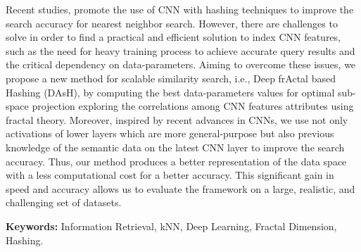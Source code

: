 Recent studies, promote the use of  \ac{CNN} with hashing techniques to improve the search accuracy for nearest neighbor search. However, there are challenges to solve in order to find a practical and efficient solution to index CNN features, such as the need for heavy training process to achieve accurate query results and the critical dependency on data-parameters.   Aiming to overcome these issues, we propose a new method for scalable similarity search, i.e., Deep frActal based  Hashing (DAsH), by computing the best data-parameters values for optimal sub-space projection  exploring the correlations among CNN features attributes using fractal theory. Moreover, inspired by recent advances in CNNs, we use not only activations of lower layers which are more general-purpose but also previous knowledge of the semantic data on the latest CNN layer to improve the search accuracy.  Thus, our method produces a better representation of the data space with a less computational cost for a better accuracy.  This significant gain in speed and accuracy allows us to evaluate the framework on a  large, realistic, and challenging set of datasets.  




\singlespacing
\vspace*{0.5cm} \noindent \textbf{Keywords:}  Information Retrieval, kNN, Deep Learning, Fractal Dimension, Hashing.